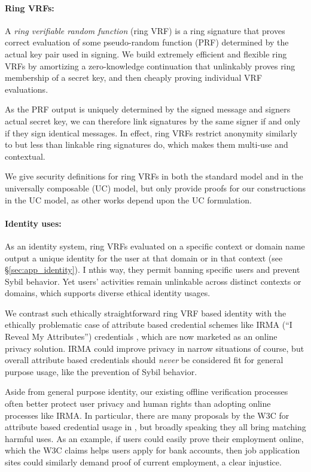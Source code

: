\paragraph{Ring VRFs:}

A {\it ring verifiable random function} (ring VRF) is a ring signature
that proves correct evaluation of some pseudo-random function (PRF)
determined by the actual key pair used in signing. %
We build extremely efficient and flexible ring VRFs by amortizing a
zero-knowledge continuation that unlinkably proves ring membership
of a secret key, and then cheaply proving individual VRF evaluations.

As the PRF output is uniquely determined by the signed message and
signers actual secret key, we can therefore link signatures by the
same signer if and only if they sign identical messages.
In effect, ring VRFs restrict anonymity similarly to but less than
 linkable ring signatures do, which makes them multi-use and contextual.

We give security definitions for ring VRFs in both the standard model
and in the universally composable (UC) \cite{canetti1,canetti2} model,
but only provide proofs for our constructions in the UC model, as other
works depend upon the UC formulation.

\paragraph{Identity uses:}

As an identity system, ring VRFs evaluated on a specific context or
domain name output a unique identity for the user at that domain or
in that context (see \S\ref{sec:app_identity}).  I nthis way, they
permit banning specific users and prevent Sybil behavior.
Yet users' activities remain unlinkable across distinct contexts or
domains, which supports diverse ethical identity usages.

We contrast such ethically straightforward ring VRF based identity
with the ethically problematic case of attribute based credential
schemes like IRMA (``I Reveal My Attributes'') credentials \cite{IRMAcredentials},
 which are now marketed as an online privacy solution.
IRMA could improve privacy in narrow situations of course, but
overall attribute based credentials should {\it never} be considered
fit for general purpose usage, like the prevention of Sybil behavior.

Aside from general purpose identity, our existing offline
verification processes often better protect user privacy and human
rights than adopting online processes like IRMA.
%
In particular, there are many proposals by the W3C for attribute based
credential usage in \cite{w3c_vc_use_cases}, but broadly speaking they
all bring matching harmful uses.  %
As an example, if users could easily prove their employment online, which
the W3C claims helps users apply for bank accounts, then job application
sites could similarly demand proof of current employment, a clear injustice.


